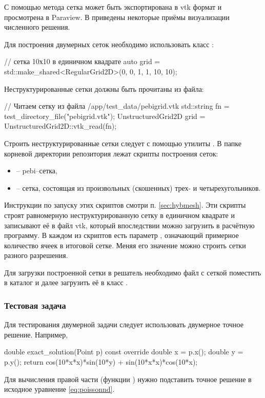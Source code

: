 С помощью метода  сетка может быть экспортирована в vtk формат и просмотрена в Paraview.
В  приведены некоторые приёмы визуализации численного решения.

Для построения двумерных сеток необходимо использовать класс :
\begin{cppcode}
// сетка 10х10 в единичном квадрате
auto grid = std::make_shared<RegularGrid2D>(0, 0, 1, 1, 10, 10);
\end{cppcode}

Неструктурированные сетки должны быть прочитаны из файла:

\begin{cppcode}
// Читаем сетку из файла /app/test_data/pebigrid.vtk
std::string fn = test_directory_file("pebigrid.vtk");
UnstructuredGrid2D grid = UnstructuredGrid2D::vtk_read(fn);
\end{cppcode}

Строить неструктурированные сетки следует с помощью утилиты .
В папке  корневой директории репозитория лежат скрипты построения сеток:
\begin{itemize}
\item {} -- pebi--сетка,
\item {} -- сетка, состоящая из произвольных (скошенных) трех- и четырехугольников.
\end{itemize}
Инструкции по запуску этих скриптов смотри п. \ref{sec:hybmesh}.
Эти скрипты строят равномерную неструктурированную сетку
в единичном квадрате
и записывают её в файл vtk, который впоследствии можно загрузить
в расчётную программу.
В каждом из скриптов есть параметр , означающий
примерное количество ячеек в итоговой сетке.
Меняя его значение можно строить сетки разного разрешения.

Для загрузки построенной сетки в решатель необходимо файл
с сеткой поместить в каталог 
и далее загрузить её в класс .

\subsubsection{Тестовая задача}
Для тестирования двумерной задачи следует использовать двумерное точное решение.
Например,
\begin{cppcode}
double exact_solution(Point p) const override{
    double x = p.x();
    double y = p.y();
    return cos(10*x*x)*sin(10*y) + sin(10*x*x)*cos(10*x);
}
\end{cppcode}
Для вычисления правой части (функции )
нужно подставить точное решение в исходное уравнение \cref{eq:poissonnd}.

